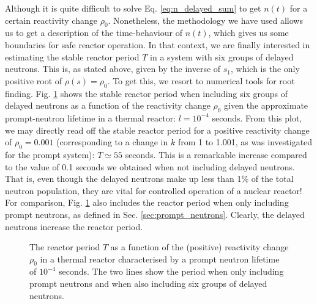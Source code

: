 Although it is quite difficult to solve Eq. \ref{eq:n_delayed_sum} to get $n(t)$ for a certain reactivity change $\rho_0$. Nonetheless, the methodology we have used allows us to get a description of the time-behaviour of $n(t)$, which gives us some boundaries for safe reactor operation. In that context, we are finally interested in estimating the stable reactor period $T$ in a system with six groups of delayed neutrons. This is, as stated above, given by the inverse of $s_1$, which is the only positive root of $\rho(s) = \rho_0$. To get this, we resort to numerical tools for root finding. Fig. \ref{fig:reactor_period} shows the stable reactor period when including six groups of delayed neutrons as a function of the reactivity change $\rho_0$ given the approximate prompt-neutron lifetime in a thermal reactor: $l = 10^{-4}$ seconds. From this plot, we may directly read off the stable reactor period for a positive reactivity change of $\rho_0 = 0.001$ (corresponding to a change in $k$ from 1 to 1.001, as was investigated for the prompt system): $T \simeq 55$ seconds. This is a remarkable increase compared to the value of 0.1 seconds we obtained when not including delayed neutrons. That is, even though the delayed neutrons make up less than 1\% of the total neutron population, they are vital for controlled operation of a nuclear reactor! For comparison, Fig. \ref{fig:reactor_period} also includes the reactor period when only including prompt neutrons, as defined in Sec. \ref{sec:prompt_neutrons}. Clearly, the delayed neutrons increase the reactor period.
\begin{figure}[ht!]
\protect {}\protect
\caption{\label{fig:reactor_period} \footnotesize{The reactor period $T$ as a function of the (positive) reactivity change $\rho_0$ in a thermal reactor characterised by a prompt neutron lifetime of $10^{-4}$ seconds. The two lines show the period when only including prompt neutrons and when also including six groups of delayed neutrons.}}
\end{figure}

